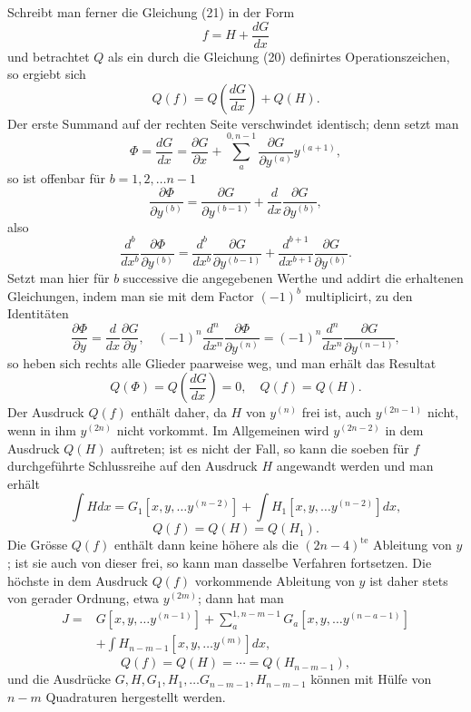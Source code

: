 \documentclass[11pt,a4paper,leqno]{article}
\begin{document}
Schreibt man ferner die Gleichung (21) in der Form
\[
f=H+\frac{dG}{dx}
\]
und betrachtet $Q$ als ein durch die Gleichung (20) definirtes Operationszeichen, so ergiebt sich
\[
Q(f)=Q\left(\frac{dG}{dx}\right)+Q(H).
\]
Der erste Summand auf der rechten Seite verschwindet identisch; denn setzt man
\[
\Phi=\frac{dG}{dx}=\frac{\partial G}{\partial x}+\sum_a^{0,n-1}\frac{\partial G}{\partial y^{(a)}}y^{(a+1)},
\]
so ist offenbar für $b=1,2,\ldots n-1$
\[
\frac{\partial\Phi}{\partial y^{(b)}}=\frac{\partial G}{\partial y^{(b-1)}}+\frac{d}{dx}\frac{\partial G}{\partial y^{(b)}},
\]
also
\[
\frac{d^b}{dx^b}\frac{\partial\Phi}{\partial y^{(b)}}=\frac{d^b}{dx^b}\frac{\partial G}{\partial y^{(b-1)}}+\frac{d^{b+1}}{dx^{b+1}}\frac{\partial G}{\partial y^{(b)}}.
\]
Setzt man hier für $b$ successive die angegebenen Werthe und addirt die erhaltenen Gleichungen, indem man sie mit dem Factor $(-1)^b$ multiplicirt, zu den Identitäten
\[
\frac{\partial\Phi}{\partial y}=\frac{d}{dx}\frac{\partial G}{\partial y},
\quad
(-1)^n\frac{d^n}{dx^n}\frac{\partial\Phi}{\partial y^{(n)}}=(-1)^n\frac{d^n}{dx^n}\frac{\partial G}{\partial y^{(n-1)}},
\]
so heben sich rechts alle Glieder paarweise weg, und man erhält das Resultat
\begin{equation}\tag{22}
Q(\Phi)=Q\left(\frac{dG}{dx}\right)=0,
\quad
Q(f)=Q(H).
\end{equation}
Der Ausdruck $Q(f)$ enthält daher, da $H$ von $y^{(n)}$ frei ist, auch $y^{(2n-1)}$ nicht, wenn in ihm $y^{(2n)}$ nicht vorkommt. Im Allgemeinen wird $y^{(2n-2)}$ in dem Ausdruck $Q(H)$ auftreten; ist es nicht der Fall, so kann die soeben für $f$ durchgeführte Schlussreihe auf den Ausdruck $H$ angewandt werden und man erhält
\[
\int Hdx=G_1[x,y,\ldots y^{(n-2)}]+\int H_1[x,y,\ldots y^{(n-2)}]dx,
\]
\[
Q(f)=Q(H)=Q(H_1).
\]
Die Grösse $Q(f)$ enthält dann keine höhere als die $(2n-4)^{\mathrm{te}}$ Ableitung von $y$; ist sie auch von dieser frei, so kann man dasselbe Verfahren fortsetzen. Die höchste in dem Ausdruck $Q(f)$ vorkommende Ableitung von $y$ ist daher stets von gerader Ordnung, etwa $y^{(2m)}$; dann hat man
\begin{equation}\tag{23}
\begin{aligned}
J={}&G[x,y,\ldots y^{(n-1)}]+\sum_a^{1,n-m-1}G_a[x,y,\ldots y^{(n-a-1)}] \\
&+\int H_{n-m-1}[x,y,\ldots y^{(m)}]dx,
\end{aligned}
\end{equation}
\[
Q(f)=Q(H)=\cdots=Q(H_{n-m-1}),
\]
und die Ausdrücke $G,H,G_1,H_1,\ldots G_{n-m-1},H_{n-m-1}$ können mit Hülfe von $n-m$ Quadraturen hergestellt werden.
\end{document}
